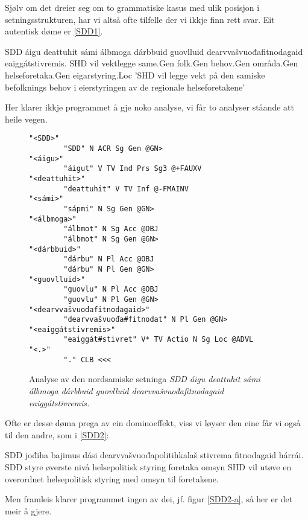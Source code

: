\documentclass[a4paper,nynorsk]{article}
\begin{document}
Sjølv om det dreier seg om to grammatiske kasus med ulik posisjon i setningsstrukturen, har vi altså ofte tilfelle der vi ikkje finn rett svar. Eit autentisk døme er \ref{SDD1}. %

 \begin{example}\label{SDD1}
\gll SDD áigu deattuhit sámi álbmoga dárbbuid guovlluid dearvvašvuođafitnodagaid eaiggátstivremis.
      SHD vil vektlegge same.Gen folk.Gen behov.Gen områda.Gen helseforetaka.Gen eigarstyring.Loc
\glt  'SHD vil legge vekt på den samiske befolknings behov i eierstyringen av de regionale helseforetakene'
\glend
\end{example}

Her klarer ikkje programmet å gje noko analyse, vi får to analyser ståande att heile vegen. %

\begin{figure}[htbp]
\begin{center}
\begin{verbatim}
"<SDD>"
        "SDD" N ACR Sg Gen @GN>
"<áigu>"
        "áigut" V TV Ind Prs Sg3 @+FAUXV
"<deattuhit>"
        "deattuhit" V TV Inf @-FMAINV
"<sámi>"
        "sápmi" N Sg Gen @GN>
"<álbmoga>"
        "álbmot" N Sg Acc @OBJ
        "álbmot" N Sg Gen @GN>
"<dárbbuid>"
        "dárbu" N Pl Acc @OBJ
        "dárbu" N Pl Gen @GN>
"<guovlluid>"
        "guovlu" N Pl Acc @OBJ
        "guovlu" N Pl Gen @GN>
"<dearvvašvuođafitnodagaid>"
        "dearvvašvuođa#fitnodat" N Pl Gen @GN>
"<eaiggátstivremis>"
        "eaiggát#stivret" V* TV Actio N Sg Loc @ADVL
"<.>"
        "." CLB <<<
\end{verbatim}
\caption{Analyse av den nordsamiske setninga \textit{SDD áigu deattuhit sámi álbmoga dárbbuid guovlluid dearvvašvuođafitnodagaid eaiggátstivremis.}}
\label{SDD1-a}
\end{center}
\end{figure}


Ofte er desse døma prega av ein dominoeffekt, viss vi løyser den eine får vi også til den andre, som i \ref{SDD2}: %

\begin{example}\label{SDD2}
\gll SDD jođiha bajimus dási dearvvašvuođapolitihkalaš stivrema fitnodagaid hárrái.
      SDD styre øverste nivå helsepolitisk styring foretaka omsyn
\glt      SHD vil utøve en overordnet helsepolitisk styring med omsyn til foretakene.
\glend
\end{example}

Men framleis klarer programmet ingen av dei, jf. figur \ref{SDD2-a}, så her er det meir å gjere. %
\end{document}
